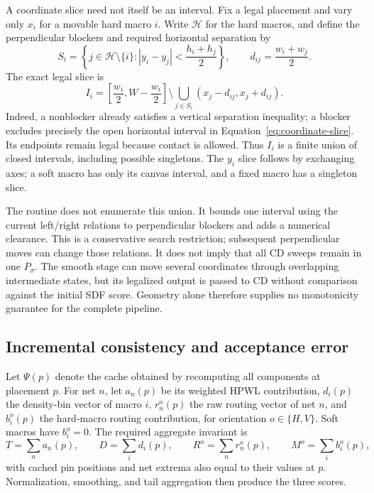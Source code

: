 A coordinate slice need not itself be an interval. Fix a legal placement and
vary only $x_i$ for a movable hard macro $i$. Write $\mathcal H$ for the hard
macros, and define the perpendicular blockers and required horizontal separation
by
\begin{equation}
 S_i=\left\{j\in\mathcal H\setminus\{i\}:
 |y_i-y_j|<\frac{h_i+h_j}{2}\right\},
 \qquad d_{ij}=\frac{w_i+w_j}{2}.
\end{equation}
The exact legal slice is
\begin{equation}
 I_i=\left[\frac{w_i}{2},W-\frac{w_i}{2}\right]
 \setminus\bigcup_{j\in S_i}(x_j-d_{ij},x_j+d_{ij}).
 \label{eq:coordinate-slice}
\end{equation}
Indeed, a nonblocker already satisfies a vertical separation inequality; a
blocker excludes precisely the open horizontal interval in
Equation~\eqref{eq:coordinate-slice}. Its endpoints remain legal because contact
is allowed. Thus $I_i$ is a finite union of closed intervals, including possible
singletons. The $y_i$ slice follows by exchanging axes; a soft macro has only
its canvas interval, and a fixed macro has a singleton slice.

The routine  does not enumerate this union. It bounds
one interval using the current left/right relations to perpendicular blockers
and adds a numerical clearance. This is a conservative search restriction;
subsequent perpendicular moves can change those relations. It does not imply
that all CD sweeps remain in one $P_\sigma$. The smooth stage can move several
coordinates through overlapping intermediate states, but its legalized output
is passed to CD without comparison against the initial SDF score. Geometry
alone therefore supplies no monotonicity guarantee for the complete pipeline.

\subsection{Incremental consistency and acceptance error}\label{sec:incremental-analysis}

Let $\Psi(p)$ denote the cache obtained by recomputing all components at placement
$p$. For net $n$, let $a_n(p)$ be its weighted HPWL contribution, $d_i(p)$ the
density-bin vector of macro $i$, $r_n^o(p)$ the raw routing vector of net $n$, and
$b_i^o(p)$ the hard-macro routing contribution, for orientation $o\in\{H,V\}$.
Soft macros have $b_i^o=0$. The required aggregate invariant is
\begin{equation}
 T=\sum_n a_n(p),\qquad D=\sum_i d_i(p),\qquad
 R^o=\sum_n r_n^o(p),\qquad M^o=\sum_i b_i^o(p),
 \label{eq:cache-invariant}
\end{equation}
with cached pin positions and net extrema also equal to their values at $p$.
Normalization, smoothing, and tail aggregation then produce the three scores.

